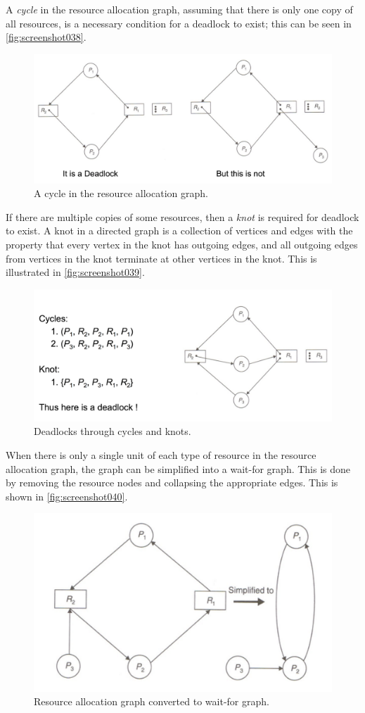 A \textit{cycle} in the resource allocation graph, assuming that there is only one copy of all resources, is a necessary condition for a deadlock to exist; this can be seen in \autoref{fig:screenshot038}.

\begin{figure}
\centering
\includegraphics[width=0.6\linewidth]{figures/screenshot038}
\caption{A cycle in the resource allocation graph.}
\label{fig:screenshot038}
\end{figure}

If there are multiple copies of some resources, then a \textit{knot} is required for deadlock to exist. A knot in a directed graph is a collection of vertices and edges with the property that every vertex in the knot has outgoing edges, and all outgoing edges from vertices in the knot terminate at other vertices in the knot. This is illustrated in \autoref{fig:screenshot039}.

\begin{figure}
\centering
\includegraphics[width=0.6\linewidth]{figures/screenshot039}
\caption{Deadlocks through cycles and knots.}
\label{fig:screenshot039}
\end{figure}

When there is only a single unit of each type of resource in the resource allocation graph, the graph can be simplified into a wait-for graph. This is done by removing the resource nodes and collapsing the appropriate edges. This is shown in \autoref{fig:screenshot040}.

\begin{figure}
\centering
\includegraphics[width=0.7\linewidth]{figures/screenshot040}
\caption{Resource allocation graph converted to wait-for graph.}
\label{fig:screenshot040}
\end{figure}

